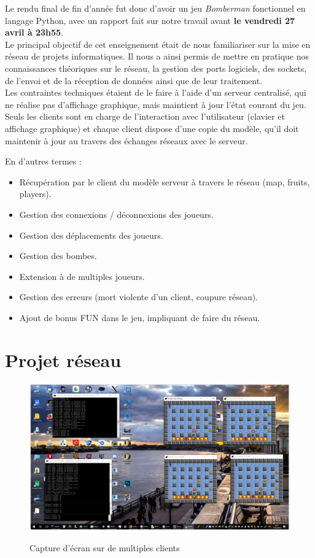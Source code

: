 \documentclass[a4paper]{article}
\begin{document}
Le rendu final de fin d'année fut donc d'avoir un jeu \textit{Bomberman} fonctionnel en langage Python, avec un rapport fait sur notre travail avant \textbf{le vendredi 27 avril à 23h55}.
\\

Le principal objectif de cet enseignement était de nous familiariser sur la mise en réseau de projets informatiques.
Il nous a ainsi permis de mettre en pratique nos connaissances théoriques sur le réseau, la gestion des ports logiciels, des sockets, de l'envoi et de la réception de données ainsi que de leur traitement.
\\

Les contraintes techniques étaient de le faire à l'aide d'un serveur centralisé, qui ne réalise pas d'affichage graphique, mais maintient à jour l'état courant du jeu.
Seuls les clients sont en charge de l'interaction avec l'utilisateur (clavier et affichage graphique) et chaque client dispose d'une copie du modèle, qu'il doit maintenir à jour au travers des échanges réseaux avec le serveur.

	En d'autres termes :
	\begin{itemize}
\item Récupération par le client du modèle serveur à travers le réseau (map, fruits, players).
\item Gestion des connexions / déconnexions des joueurs.
\item Gestion des déplacements des joueurs.
\item Gestion des bombes.
\item Extension à de multiples joueurs.
\item Gestion des erreurs (mort violente d'un client, coupure réseau).
\item Ajout de bonus FUN dans le jeu, impliquant de faire du réseau.
	\end{itemize}


\newpage
\part{Projet réseau}


\begin{figure}[!htbp]
	\centering
	\includegraphics[width=\textwidth]{IMG_Latex/multiecran.png}\\
	\caption{Capture d'écran sur de multiples clients}
	\label{shema/cp/multiple}
\end{figure}
\end{document}
